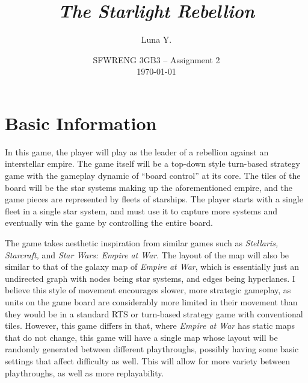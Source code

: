 \documentclass[10pt]{article}
\begin{document}
\title{\textit{The Starlight Rebellion}}
\author{Luna Y.}
\date{
    SFWRENG 3GB3 -- Assignment 2\\[0.25cm]
    \today
}
\maketitle

\tableofcontents

\section{Basic Information}

In this game, the player will play as the leader of a rebellion against an interstellar empire. The game itself will be a top-down style
turn-based strategy game with the gameplay dynamic of ``board control'' at its core. The tiles of the board will be the star systems
making up the aforementioned empire, and the game pieces are represented by fleets of starships. The player starts with a single fleet
in a single star system, and must use it to capture more systems and eventually win the game by controlling the entire board.

The game takes aesthetic inspiration from similar games such as \textit{Stellaris, Starcraft,} and \textit{Star Wars: Empire at War}.
The layout of the map will also be similar to that of the galaxy map of \textit{Empire at War}, which is essentially just an undirected graph
with nodes being star systems, and edges being hyperlanes. I believe this style of movement encourages slower, more strategic gameplay,
as units on the game board are considerably more limited in their movement than they would be in a standard RTS or turn-based strategy
game with conventional tiles. However, this game differs in that, where \textit{Empire at War} has static maps that do not change,
this game will have a single map whose layout will be randomly generated between different playthroughs, possibly having some basic
settings that affect difficulty as well. This will allow for more variety between playthroughs, as well as more replayability.
\end{document}
